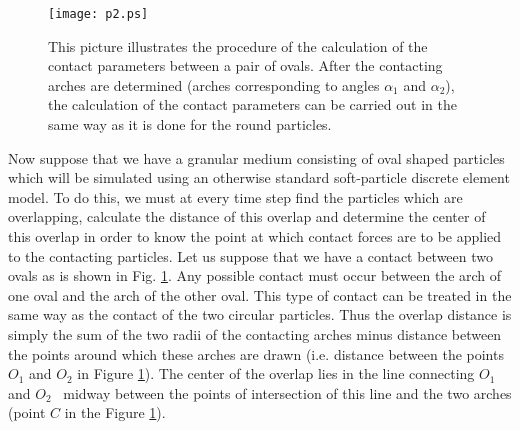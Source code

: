 \documentclass[granma]{svjour}
\begin{document}
\begin{figure}
\texttt{[image: p2.ps]}
\caption{This picture illustrates the procedure of the calculation of the
contact parameters between a pair of ovals. After the contacting arches are
determined (arches corresponding to angles $\alpha_1$ and $\alpha_2$), the
calculation of the contact parameters can be carried out in the same way as
it is done for the round particles.}\label{fig2}
\end{figure}

Now suppose that we have a granular medium consisting of oval shaped
particles which will be simulated using an otherwise standard soft-particle
discrete element model. To do this, we must at every time step find the
particles which are overlapping, calculate the distance of this overlap and
determine the center of this overlap in order to know the point at which
contact forces are to be applied to the contacting particles. Let us suppose
that we have a contact between two ovals as is shown in Fig. \ref{fig2}.
Any possible
contact must occur between the arch of one oval and the arch of the other
oval. This type of contact can be treated in the same way as the contact of
the two circular particles. Thus the overlap distance is simply the sum of
the two radii of the contacting arches minus distance between the points
around which these arches are drawn (i.e. distance between the points $O_1$
and $O_2$ in Figure \ref{fig2}). The center of the overlap lies in the
line connecting
$O_1$ and $O_2$ \ midway between the points of intersection of this line and
the two arches (point $C$ in the Figure \ref{fig2}).
\end{document}
